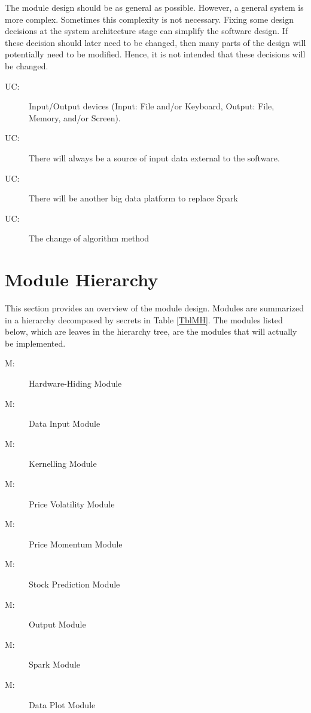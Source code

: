 \documentclass[12pt, titlepage]{article}
\newcounter{ucnum}
\newcommand{\uctheucnum}{UC\theucnum}
\newcounter{mnum}
\newcommand{\mthemnum}{M\themnum}
\begin{document}
The module design should be as general as possible. However, a general system is
more complex. Sometimes this complexity is not necessary. Fixing some design
decisions at the system architecture stage can simplify the software design. If
these decision should later need to be changed, then many parts of the design
will potentially need to be modified. Hence, it is not intended that these
decisions will be changed.

\begin{description}
\item[ \uctheucnum \label{UC1}:] Input/Output devices
(Input: File and/or Keyboard, Output: File, Memory, and/or Screen).
\item[ \uctheucnum \label{UC2}:] There will always be
a source of input data external to the software.
\item[ \uctheucnum \label{UC3}:] There will be another big
  data platform to replace Spark 
\item[ \uctheucnum \label{UC4}:] The change of algorithm method
\end{description}

\section{Module Hierarchy} \label{SecMH}

This section provides an overview of the module design. Modules are summarized
in a hierarchy decomposed by secrets in Table \ref{TblMH}. The modules listed
below, which are leaves in the hierarchy tree, are the modules that will
actually be implemented.

\begin{description}
\item [ \mthemnum \label{mHH}:] Hardware-Hiding Module
\item [ \mthemnum \label{mInput}:] Data Input Module
\item [ \mthemnum \label{mKernelling}:]Kernelling Module
\item [ \mthemnum \label{mVolatility}:] Price Volatility Module
\item [ \mthemnum \label{mMomentum}:] Price Momentum Module
\item [ \mthemnum \label{mPrediction}:] Stock Prediction Module
\item [ \mthemnum \label{mOutput}:] Output Module
\item [ \mthemnum \label{mSpark}:] Spark Module
\item [ \mthemnum \label{mPlot}:] Data Plot Module
\end{description}
\end{document}
